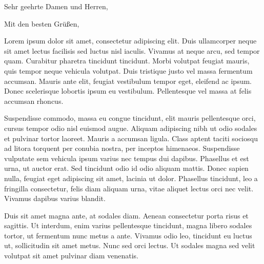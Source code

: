 \documentclass[11pt, a4paper, roman]{moderncv}        %
\begin{document}
\opening{Sehr geehrte Damen und Herren,}
\closing{Mit den besten Grüßen,}

\makelettertitle

Lorem ipsum dolor sit amet, consectetur adipiscing elit. Duis ullamcorper neque sit amet lectus facilisis sed luctus nisl iaculis. Vivamus at neque arcu, sed tempor quam. Curabitur pharetra tincidunt tincidunt. Morbi volutpat feugiat mauris, quis tempor neque vehicula volutpat. Duis tristique justo vel massa fermentum accumsan. Mauris ante elit, feugiat vestibulum tempor eget, eleifend ac ipsum. Donec scelerisque lobortis ipsum eu vestibulum. Pellentesque vel massa at felis accumsan rhoncus.

Suspendisse commodo, massa eu congue tincidunt, elit mauris pellentesque orci, cursus tempor odio nisl euismod augue. Aliquam adipiscing nibh ut odio sodales et pulvinar tortor laoreet. Mauris a accumsan ligula. Class aptent taciti sociosqu ad litora torquent per conubia nostra, per inceptos himenaeos. Suspendisse vulputate sem vehicula ipsum varius nec tempus dui dapibus. Phasellus et est urna, ut auctor erat. Sed tincidunt odio id odio aliquam mattis. Donec sapien nulla, feugiat eget adipiscing sit amet, lacinia ut dolor. Phasellus tincidunt, leo a fringilla consectetur, felis diam aliquam urna, vitae aliquet lectus orci nec velit. Vivamus dapibus varius blandit.

Duis sit amet magna ante, at sodales diam. Aenean consectetur porta risus et sagittis. Ut interdum, enim varius pellentesque tincidunt, magna libero sodales tortor, ut fermentum nunc metus a ante. Vivamus odio leo, tincidunt eu luctus ut, sollicitudin sit amet metus. Nunc sed orci lectus. Ut sodales magna sed velit volutpat sit amet pulvinar diam venenatis.


\makeletterclosing

\newpage

\makecvtitle
\end{document}
